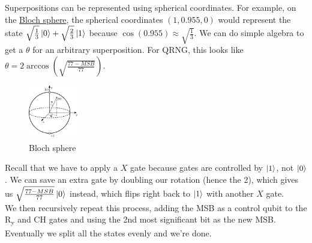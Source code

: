 \documentclass[12pt]{article}
\begin{document}
Superpositions can be represented using spherical coordinates. For example, on the \hyperref[fig:bsphere2]{Bloch sphere}, the spherical coordinates $(1, 0.955, 0)$ would represent the state $\sqrt{\frac{1}{3}} \ket{0} + \sqrt{\frac{2}{3}} \ket{1}$ because $\cos (0.955) \approx \sqrt{\frac{1}{3}}$. We can do simple algebra to get a $\theta$ for an arbitrary superposition. For QRNG, this looks like $\theta = 2\arccos(\sqrt{\frac{77 - MSB}{77}})$. \\
\begin{figure}[H]
    \centering
    \capstart
    \includegraphics[width=0.19\textwidth]{images/bloch_sphere2.png}
    \caption{Bloch sphere\textsuperscript{\cite{wikipedia_2021}}}
    \label{fig:bsphere2}
\end{figure}
\noindent Recall that we have to apply a $X$ gate because gates are controlled by $\ket{1}$, not $\ket{0}$. We can save an extra gate by doubling our rotation (hence the 2), which gives us $\sqrt{\frac{77 - MSB}{77}} \ket{0}$ instead, which flips right back to $\ket{1}$ with another $X$ gate. \\
\indent We then recursively repeat this process, adding the MSB as a control qubit to the R\textsubscript{y} and CH gates and using the 2nd most significant bit as the new MSB. Eventually we split all the states evenly and we're done. \\
\end{document}
